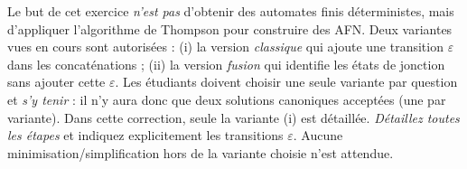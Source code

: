 \begin{corrections}

  Le but de cet exercice \emph{n'est pas} d'obtenir des automates finis déterministes, mais d'appliquer l'algorithme de Thompson pour construire des AFN.
  Deux variantes vues en cours sont autorisées :
  (i) la version \emph{classique} qui ajoute une transition $\varepsilon$ dans les concaténations ;
  (ii) la version \emph{fusion} qui identifie les états de jonction sans ajouter cette $\varepsilon$.
  Les étudiants doivent choisir une seule variante par question et \emph{s'y tenir} :
  il n'y aura donc que deux solutions canoniques acceptées (une par variante).
  Dans cette correction, seule la variante (i) est détaillée. 
  \emph{Détaillez toutes les étapes} et indiquez explicitement les transitions $\varepsilon$.
  Aucune minimisation/simplification hors de la variante choisie n'est attendue.
  

\end{corrections}
